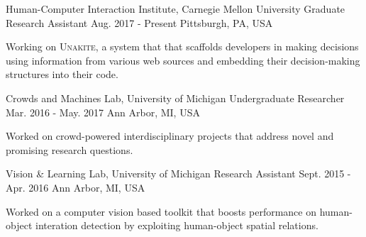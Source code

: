 
\begin{cventries}
\cventry
  {Human-Computer Interaction Institute, Carnegie Mellon University} %
  {Graduate Research Assistant } %
  {Aug. 2017 - Present} %
  {Pittsburgh, PA, USA} %
  {
    \begin{cvitems} %
      \item {Working on \textsc{Unakite}, a system that that scaffolds developers in making decisions using information from various web sources and embedding their decision-making structures into their code.}
    \end{cvitems}
  }

\cventry
  {Crowds and Machines Lab, University of Michigan} %
  {Undergraduate Researcher } %
  {Mar. 2016 - May. 2017} %
  {Ann Arbor, MI, USA} %
  {
    \begin{cvitems} %
      \item {Worked on crowd-powered interdisciplinary projects that address novel and promising research questions.}
    \end{cvitems}
  }

\cventry
  {Vision \& Learning Lab, University of Michigan} %
  {Research Assistant } %
  {Sept. 2015 - Apr. 2016} %
  {Ann Arbor, MI, USA} %
  {
    \begin{cvitems} %
      \item {Worked on a computer vision based toolkit that boosts performance on human-object interation detection by exploiting human-object spatial relations.}
    \end{cvitems}
  }
\end{cventries}





